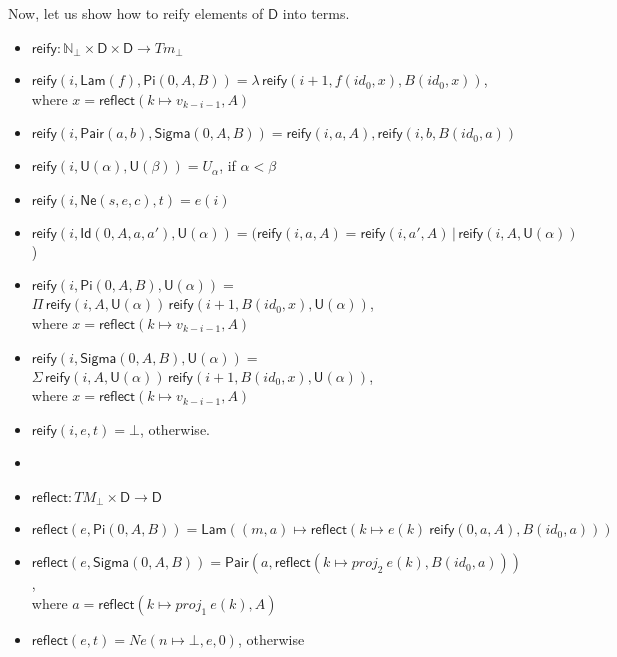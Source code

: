 \documentclass{amsart}
\theoremstyle{definition}
\theoremstyle{remark}
\newcommand{\D}{\mathsf{D}}
\newcommand{\nats}{\mathbb{N}}
\numberwithin{table}{section}
\begin{document}
Now, let us show how to reify elements of $\D$ into terms.
\begin{itemize}
\item[] $\mathsf{reify} : \nats_\bot \times \D \times \D \to Tm_\bot$
\item[] $\mathsf{reify}(i, \mathsf{Lam}(f), \mathsf{Pi}(0, A, B)) = \lambda\,\mathsf{reify}(i + 1, f(id_0, x), B(id_0, x))$, \\
        \indent where $x = \mathsf{reflect}(k \mapsto v_{k - i - 1}, A)$
\item[] $\mathsf{reify}(i, \mathsf{Pair}(a, b), \mathsf{Sigma}(0, A, B)) = \mathsf{reify}(i, a, A), \mathsf{reify}(i, b, B(id_0, a))$
\item[] $\mathsf{reify}(i, \mathsf{U}(\alpha), \mathsf{U}(\beta)) = U_\alpha$, if $\alpha < \beta$
\item[] $\mathsf{reify}(i, \mathsf{Ne}(s, e, c), t) = e(i)$
\item[] $\mathsf{reify}(i, \mathsf{Id}(0, A, a, a'), \mathsf{U}(\alpha)) = (\mathsf{reify}(i, a, A) = \mathsf{reify}(i, a', A)\,|\,\mathsf{reify}(i, A, \mathsf{U}(\alpha))$)
\item[] $\mathsf{reify}(i, \mathsf{Pi}(0, A, B), \mathsf{U}(\alpha)) =$
        $\Pi\,\mathsf{reify}(i, A, \mathsf{U}(\alpha))\,\mathsf{reify}(i + 1, B(id_0, x), \mathsf{U}(\alpha))$, \\
        \indent where $x = \mathsf{reflect}(k \mapsto v_{k - i - 1}, A)$
\item[] $\mathsf{reify}(i, \mathsf{Sigma}(0, A, B), \mathsf{U}(\alpha)) = $
        $\Sigma\,\mathsf{reify}(i, A, \mathsf{U}(\alpha))\,\mathsf{reify}(i + 1, B(id_0, x), \mathsf{U}(\alpha))$, \\
        \indent where $x = \mathsf{reflect}(k \mapsto v_{k - i - 1}, A)$
\item[] $\mathsf{reify}(i, e, t) = \bot$, otherwise.
\item[]
\item[] $\mathsf{reflect} : TM_\bot \times \D \to \D$
\item[] $\mathsf{reflect}(e,\mathsf{Pi}(0, A, B)) = \mathsf{Lam}((m, a) \mapsto \mathsf{reflect}(k \mapsto e(k)\ \mathsf{reify}(0, a, A), B(id_0, a)))$
\item[] $\mathsf{reflect}(e,\mathsf{Sigma}(0, A, B)) = \mathsf{Pair}(a, \mathsf{reflect}(k \mapsto proj_2\ e(k), B(id_0, a)))$, \\
        \indent where $a = \mathsf{reflect}(k \mapsto proj_1\ e(k), A)$
\item[] $\mathsf{reflect}(e,t) = Ne(n \mapsto \bot, e, 0)$, otherwise
\end{itemize}



\end{document}

